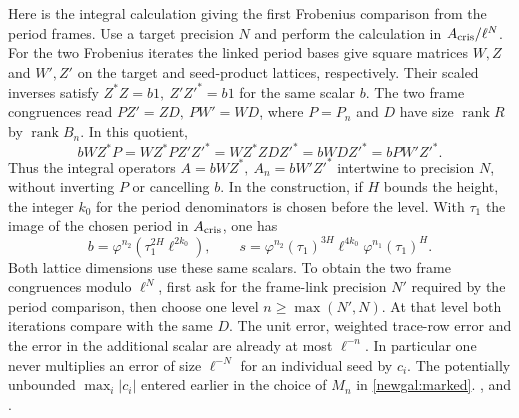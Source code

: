 Here is the integral calculation giving the first Frobenius comparison
from the period frames. Use a target precision \(N\) and perform the
calculation in \(A_{\rm cris}/\ell^N\). For the two Frobenius iterates the
linked period bases give square matrices \(W,Z\) and \(W',Z'\) on the
target and seed-product lattices, respectively. Their scaled inverses
satisfy \(Z^*Z=b1,\ Z'Z'^*=b1\) for the same scalar \(b\). The two
frame congruences read \(PZ'=ZD,\ PW'=WD\), where \(P=P_n\) and \(D\)
have size \(\operatorname{rank}R\) by \(\operatorname{rank}B_n\).
In this quotient,
\[
 bWZ^*P=WZ^*PZ'Z'^*=WZ^*ZDZ'^*=bWDZ'^*=bPW'Z'^*.
\]
Thus the integral operators \(A=bWZ^*,\ A_n=bW'Z'^*\) intertwine to
precision \(N\), without inverting \(P\) or cancelling \(b\).
In the construction, if \(H\) bounds the height, the integer \(k_0\)
for the period denominators is chosen before the level. With
\(\tau_1\) the image of the chosen period in \(A_{\rm cris}\), one has
\[
 b=\varphi^{n_2}(\tau_1^{2H}\ell^{2k_0}),\qquad
 s=\varphi^{n_2}(\tau_1)^{3H}\ell^{4k_0}\varphi^{n_1}(\tau_1)^H.
\]
Both lattice dimensions use these same scalars. To obtain the two frame
congruences modulo \(\ell^N\), first ask for the frame-link precision
\(N'\) required by the period comparison, then choose one level
\(n\ge\max(N',N)\). At that level both iterations compare with the
same \(D\). The unit error, weighted trace-row error and the error in
the additional scalar are already at most \(\ell^{-n}\). In particular
one never multiplies an error of size \(\ell^{-N}\) for an individual
seed by \(c_i\). The potentially unbounded \(\max_i|c_i|\) entered
earlier in the choice of \(M_n\) in \eqref{newgal:marked}.
,
and .

